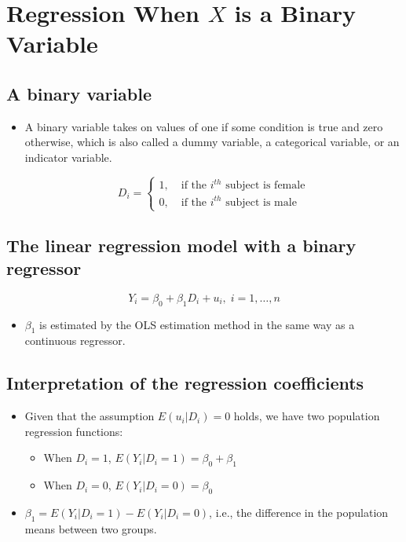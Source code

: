 \documentclass[presentation]{beamer}
\begin{document}
\section*{Regression When \(X\) is a Binary Variable}
\label{sec:org8937ca8}

\subsection*{A binary variable}
\label{sec:org47a6f9e}

\begin{itemize}
\item A \alert{binary variable} takes on values of one if some condition is true
and zero otherwise, which is also called a \alert{dummy variable}, a
\alert{categorical variable}, or an \alert{indicator variable}.

\begin{equation*}
D_i =
\begin{cases}
1,\; &\text{if the } i^{th} \text{ subject is female} \\
0,\; &\text{if the } i^{th} \text{ subject is male}
\end{cases}
\end{equation*}
\end{itemize}

\subsection*{The linear regression model with a binary regressor}
\label{sec:org730ff51}

\begin{equation}
Y_i = \beta_0 + \beta_1 D_i + u_i,\; i = 1, \ldots, n
\end{equation}

\begin{itemize}
\item \(\beta_1\) is estimated by the OLS estimation method
in the same way as a continuous regressor.
\end{itemize}

\subsection*{Interpretation of the regression coefficients}
\label{sec:org19a9077}

\begin{itemize}
\item Given that the assumption \(E(u_i | D_i) = 0\) holds, we have two
population regression functions:
\begin{itemize}
\item When \(D_i = 1\), \(E(Y_i|D_i = 1) = \beta_0 + \beta_1\)
\item When \(D_i = 0\), \(E(Y_i|D_i = 0) = \beta_0\)
\end{itemize}

\item \(\beta_1 = E(Y_i | D_i = 1) - E(Y_i |D_i = 0)\), i.e.,
\alert{the difference in the population means} between two groups.
\end{itemize}
\end{document}
